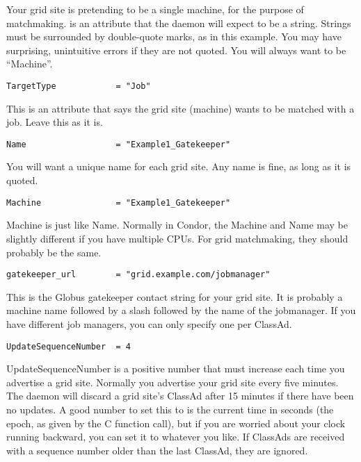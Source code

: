 Your grid site is pretending to be a single machine, for the purpose
of matchmaking.  is an attribute that the 
daemon
will expect to be a string. Strings must be surrounded by double-quote
marks, as in this example. You may have surprising, unintuitive errors
if they are not quoted. You will always want  to be
``Machine''. 

\begin{verbatim}
TargetType            = "Job"
\end{verbatim}

This is an attribute that says the grid site (machine) wants to be
matched with a job. Leave this as it is. 


\footnotesize
\begin{verbatim}
Name                  = "Example1_Gatekeeper"
\end{verbatim}
\normalsize

You will want a unique name for each grid site. Any name is fine, as long as
it is quoted.

\footnotesize
\begin{verbatim}
Machine               = "Example1_Gatekeeper"
\end{verbatim}
\normalsize

Machine is just like Name. Normally in Condor, the Machine and Name
may be slightly different if you have multiple CPUs. For grid
matchmaking, they should probably be the same.

\footnotesize
\begin{verbatim}
gatekeeper_url        = "grid.example.com/jobmanager"
\end{verbatim}
\normalsize

This is the Globus gatekeeper contact string for your grid site. It is
probably a machine name followed by a slash followed by the name of
the jobmanager. If you have different job managers, you can only
specify one per ClassAd. 

\begin{verbatim}
UpdateSequenceNumber  = 4
\end{verbatim}

UpdateSequenceNumber is a positive number that must increase each time
you advertise a grid site. Normally you advertise your grid site
every five minutes. The  daemon will discard a grid site's
ClassAd after 15 minutes if there have been no updates. A good number
to set this to is the current time in seconds (the epoch, as given by
the C  function call), but if you are worried about your clock
running backward, you can set it to whatever you like. If ClassAds are
received with a sequence number older than the last ClassAd, they are
ignored. 

